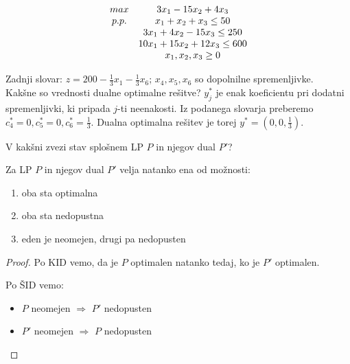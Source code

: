 \documentclass[11pt, a4paper]{article}
\begin{document}
    \begin{example}
        \[
            \begin{array}{ c c }
                max & 3x_1-15x_2+4x_3 \\
                p.p. & x_1+x_2+x_3 \le 50 \\
                & 3x_1+4x_2-15x_3 \le 250 \\
                & 10x_1+15x_2+12x_3 \le 600 \\
                & x_1,x_2,x_3 \ge 0 \\
            \end{array}
        \]
        
        Zadnji slovar: \(z=200 - \frac{1}{3}x_1 - \frac{1}{3}x_6\); \(x_4,x_5,x_6\) so dopolnilne spremenljivke. \\

        Kakšne so vrednosti dualne optimalne rešitve? \(y_j^*\) je enak koeficientu pri dodatni spremenljivki, ki pripada \(j\)-ti neenakosti. Iz podanega slovarja preberemo \(c_4^*=0,c_5^*=0,c_6^*=\frac{1}{3}\). Dualna optimalna rešitev je torej \({y^* = (0, 0, \frac{1}{3})}\).
    \end{example}

    V kakšni zvezi stav splošnem LP \(P\) in njegov dual \(P'\)?
    \begin{proposition}
        Za LP \(P\) in njegov dual \(P'\) velja natanko ena od možnosti:
        \begin{enumerate}
            \item oba sta optimalna
            \item oba sta nedopustna
            \item eden je neomejen, drugi pa nedopusten
        \end{enumerate}
    \end{proposition}

    \begin{proof}
        Po KID vemo, da je \(P\) optimalen natanko tedaj, ko je \(P'\) optimalen. \par
        Po ŠID vemo:
        \begin{itemize}
            \item \(P\) neomejen \(\Rightarrow\) \(P'\) nedopusten
            \item \(P'\) neomejen \(\Rightarrow\) \(P\) nedopusten
        \end{itemize}
    \end{proof}
\end{document}
